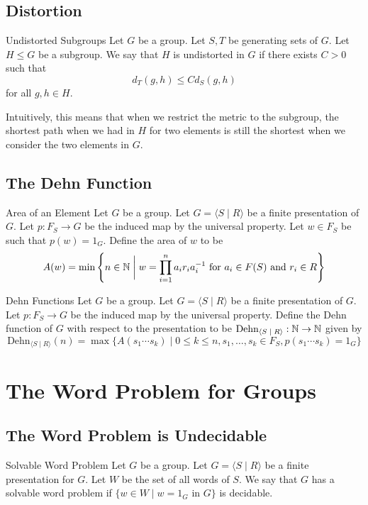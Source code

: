 \documentclass[a4paper]{article}
\begin{document}
\subsection{Distortion}
\begin{defn}{Undistorted Subgroups}{} Let $G$ be a group. Let $S,T$ be generating sets of $G$. Let $H\leq G$ be a subgroup. We say that $H$ is undistorted in $G$ if there exists $C>0$ such that $$d_T(g,h)\leq C d_S(g,h)$$ for all $g,h\in H$. 
\end{defn}

Intuitively, this means that when we restrict the metric to the subgroup, the shortest path when we had in $H$ for two elements is still the shortest when we consider the two elements in $G$. 

\subsection{The Dehn Function}
\begin{defn}{Area of an Element}{} Let $G$ be a group. Let $G=\langle S\;|\;R\rangle$ be a finite presentation of $G$. Let $p:F_S\to G$ be the induced map by the universal property. Let $w\in F_S$ be such that $p(w)=1_G$. Define the area of $w$ to be $$A(w)=\min\left\{n\in\mathbb{N}\;\bigg{|}\;w=\prod_{i=1}^na_ir_ia_i^{-1}\text{ for }a_i\in F(S)\text{ and }r_i\in R\right\}$$
\end{defn}

\begin{defn}{Dehn Functions}{} Let $G$ be a group. Let $G=\langle S\;|\;R\rangle$ be a finite presentation of $G$. Let $p:F_S\to G$ be the induced map by the universal property. Define the Dehn function of $G$ with respect to the presentation to be $\text{Dehn}_{\langle S\;|\;R\rangle}:\mathbb{N}\to\mathbb{N}$ given by $$\text{Dehn}_{\langle S\;|\;R\rangle}(n)=\max\{A(s_1\cdots s_k)\;|\;0\leq k\leq n, s_1,\dots,s_k\in F_S, p(s_1\cdots s_k)=1_G\}$$
\end{defn}

\pagebreak
\section{The Word Problem for Groups}
\subsection{The Word Problem is Undecidable}
\begin{defn}{Solvable Word Problem}{} Let $G$ be a group. Let $G=\langle S\;|\;R\rangle$ be a finite presentation for $G$. Let $W$ be the set of all words of $S$. We say that $G$ has a solvable word problem if $\{w\in W\;|\;w=1_G\text{ in }G\}$ is decidable. 
\end{defn}
\end{document}
